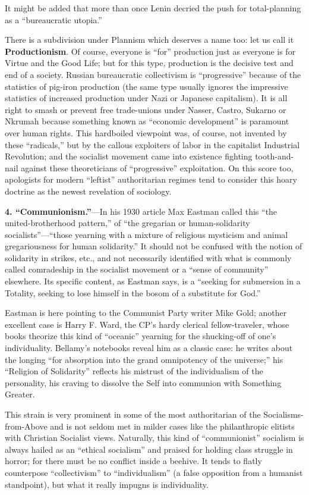 It might be added that more than once Lenin decried the push for total-planning as a ``bureaucratic utopia.''

There is a subdivision under Plannism which deserves a name too: let us call it \textbf{Productionism}. Of course, everyone is ``for'' production just as everyone is for Virtue and the Good Life; but for this type, production is the decisive test and end of a society. Russian bureaucratic collectivism is ``progressive'' because of the statistics of pig-iron production (the same type usually ignores the impressive statistics of increased production under Nazi or Japanese capitalism). It is all right to smash or prevent free trade-unions under Nasser, Castro, Sukarno or Nkrumah because something known as ``economic development'' is paramount over human rights. This hardboiled viewpoint was, of course, not invented by these ``radicals,'' but by the callous exploiters of labor in the capitalist Industrial Revolution; and the socialist movement came into existence fighting tooth-and-nail against these theoreticians of ``progressive'' exploitation. On this score too, apologists for modern ``leftist'' authoritarian regimes tend to consider this hoary doctrine as the newest revelation of sociology.

\textbf{4. ``Communionism.''}---In his 1930 article Max Eastman called this ``the united-brotherhood pattern,'' of ``the gregarian or human-solidarity socialists''---``those yearning with a mixture of religious mysticism and animal gregariousness for human solidarity.'' It should not be confused with the notion of solidarity in strikes, etc., and not necessarily identified with what is commonly called comradeship in the socialist movement or a ``sense of community'' elsewhere. Its specific content, as Eastman says, is a ``seeking for submersion in a Totality, seeking to lose himself in the bosom of a substitute for God.''

Eastman is here pointing to the Communist Party writer Mike Gold; another excellent case is Harry F. Ward, the CP's hardy clerical fellow-traveler, whose books theorize this kind of ``oceanic'' yearning for the shucking-off of one's individuality. Bellamy's notebooks reveal him as a classic case: he writes about the longing ``for absorption into the grand omnipotency of the universe;'' his ``Religion of Solidarity'' reflects his mistrust of the individualism of the personality, his craving to dissolve the Self into communion with Something Greater.

This strain is very prominent in some of the most authoritarian of the Socialisms-from-Above and is not seldom met in milder cases like the philanthropic elitists with Christian Socialist views. Naturally, this kind of ``communionist'' socialism is always hailed as an ``ethical socialism'' and praised for holding class struggle in horror; for there must be no conflict inside a beehive. It tends to flatly counterpose ``collectivism'' to ``individualism'' (a false opposition from a humanist standpoint), but what it really impugns is individuality.

